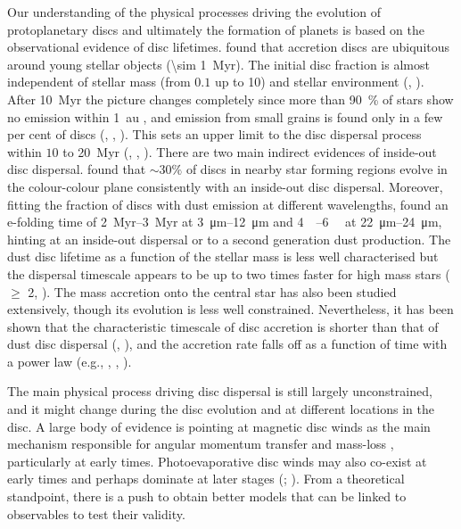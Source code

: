 Our understanding of the physical processes driving the evolution of protoplanetary discs and ultimately the formation of planets is based on the observational evidence of disc lifetimes.
\citet{1989AJ.....97.1451S} found that accretion discs are ubiquitous around young stellar objects (\SI{\sim 1}{Myr}). The initial disc fraction is almost independent of stellar mass (from $0.1$ up to \SI{10}{\solarmass}) and stellar environment (\citet{2000AJ....120.3162L}, \citet{2006A&A...451..177B}).
After \SI{10}{Myr} the picture changes completely since more than \SI{90}{\percent} of stars show no emission within \SI{1}{\astronomicalunit} \citep{2004ApJ...612..496M}, and emission from small grains is found only in a few per cent of discs (\citet{2004ApJ...608..526L}, \citet{2005AJ....129.1049C}, \citet{2006ApJ...639.1138S}).
This sets an upper limit to the disc dispersal process within $10$ to \SI{20}{Myr} (\citet{2007ApJ...671.1784H}, \citet{2010A&A...510A..72F}, \citet{2014A&A...561A..54R}).
There are two main indirect evidences of inside-out disc dispersal. \citet{2013MNRAS.428.3327K} found that $\sim30\%$ of discs in nearby star forming regions evolve in the colour-colour plane consistently with an inside-out disc dispersal. Moreover, fitting the fraction of discs with dust emission at different wavelengths, \citet{2014A&A...561A..54R} found an e-folding time of \SIrange{2}{3}{Myr} at \SIrange[]{3}{12}{\micro\meter} and \SIrange[]{4}{6}{\mega\year} at \SIrange[]{22}{24}{\micro\meter}, hinting at an inside-out dispersal or to a second generation dust production.
The dust disc lifetime as a function of the stellar mass is less well characterised but the dispersal timescale appears to be up to two times faster for high mass stars ($\geq$ \SI{2}{\solarmass}, \cite{2015A&A...576A..52R}).
The mass accretion onto the central star has also been studied extensively, though its evolution is less well constrained. Nevertheless, it has been shown that the characteristic timescale of disc accretion is shorter than that of dust disc dispersal (\cite{2006ApJ...648.1206J}, \cite{2010A&A...510A..72F}), and the accretion rate falls off as a function of time with a power law (e.g., \cite{2012ApJ...755..154M}, \cite{2014A&A...572A..62A}, \cite{2016ARA&A..54..135H}).

The main physical process driving disc dispersal is still largely unconstrained, and it might change during the disc evolution and at different locations in the disc. A large body of evidence is pointing at magnetic disc winds as the main mechanism responsible for angular momentum transfer and mass-loss \citep{2016ApJ...821...80B}, particularly at early times. Photoevaporative disc winds may also co-exist at early times and perhaps dominate at later stages (\cite{2017RSOS....470114E}; \cite{2020MNRAS.496..223W}). From a theoretical standpoint, there is a push to obtain better models that can be linked to observables to test their validity. 

